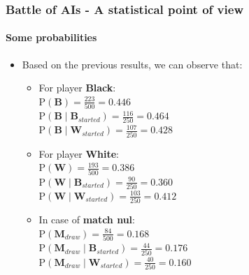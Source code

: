 \documentclass[10pt]{beamer}
\begin{document}

\begin{frame}
\frametitle{Battle of AIs - A statistical point of view}
\framesubtitle{Some probabilities}

\begin{itemize}
  	\item Based on the previous results, we can observe that:
	
	\begin{itemize}
	  \item For player \textbf{Black}: \\
	  	 \(\mathrm{P}(\textbf{B})= \frac{223}{500} = 0.446  \) \\
	  	 \(\mathrm{P}(\textbf{B} \mid  \textbf{B}_{started})= \frac{116}{250} =
	  	 0.464  \)\\
	  	 \(\mathrm{P}(\textbf{B} \mid  \textbf{W}_{started})=
	  	 \frac{107}{250} = 0.428  \)
	  	 
	  	 \vspace{10pt}
	 \item For player \textbf{White}: \\
	  	 \(\mathrm{P}(\textbf{W})= \frac{193}{500} = 0.386  \) \\
	  	 \(\mathrm{P}(\textbf{W} \mid  \textbf{B}_{started})= \frac{90}{250} =
	  	 0.360  \)\\
	  	 \(\mathrm{P}(\textbf{W} \mid  \textbf{W}_{started})=
	  	 \frac{103}{250} = 0.412  \) 
	  	 
	  	 \vspace{10pt}
	\item In case of \textbf{match nul}: \\
	  	 \(\mathrm{P}(\textbf{M}_{draw})= \frac{84}{500} = 0.168  \) \\
	  	 \(\mathrm{P}(\textbf{M}_{draw} \mid  \textbf{B}_{started})= \frac{44}{250}
	  	 = 0.176  \)\\
	  	 \(\mathrm{P}(\textbf{M}_{draw} \mid  \textbf{W}_{started})=
	  	 \frac{40}{250} = 0.160  \)

	\end{itemize}
\end{itemize}
\end{frame}

\end{document}
